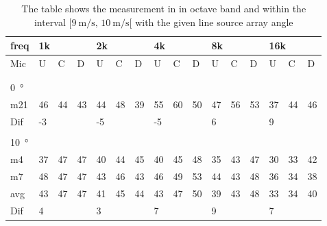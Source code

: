 \begin{table}[H]
\centering
\caption{The table shows the measurement in in octave band and within the interval $[\SI{9}{\meter\per\second},\, \SI{10}{\meter\per\second}[ $ with the given line source array angle}
\begin{tabular}{l|l|l|l|l|l|l|l|l|l|l|l|l|lll}
freq & \multicolumn{3}{l|}{1k} & \multicolumn{3}{l|}{2k} & \multicolumn{3}{l|}{4k} & \multicolumn{3}{l|}{8k} & \multicolumn{3}{l}{16k}                                \\ \hline
Mic  & U      & C      & D     & U      & C      & D     & U      & C      & D     & U      & C      & D     & \multicolumn{1}{l|}{U}  & \multicolumn{1}{l|}{C}  & D  \\ \hline
 & \multicolumn{3}{l|}{} & \multicolumn{3}{l|}{} & \multicolumn{3}{l|}{} & \multicolumn{3}{l|}{} & \multicolumn{3}{l}{}                                \\ 
 \multicolumn{16}{l}{ } \\   
\SI{0}{\degree}   & \multicolumn{3}{l|}{} & \multicolumn{3}{l|}{} & \multicolumn{3}{l|}{} & \multicolumn{3}{l|}{} & \multicolumn{3}{l}{}   \\  \hline
m21  & 46     & 44     & 43    & 44     & 48     & 39    & 55     & 60     & 50    & 47     & 56     & 53    & \multicolumn{1}{l|}{37} & \multicolumn{1}{l|}{44} & 46 \\ \hline 
Dif & \multicolumn{3}{l|}{-3} & \multicolumn{3}{l|}{-5} & \multicolumn{3}{l|}{-5} & \multicolumn{3}{l|}{6} & \multicolumn{3}{l}{9}  \\ 
 \multicolumn{16}{l}{ } \\                             
\SI{10}{\degree}   & \multicolumn{3}{l|}{} & \multicolumn{3}{l|}{} & \multicolumn{3}{l|}{} & \multicolumn{3}{l|}{} & \multicolumn{3}{l}{}   \\  \hline
m4    & 37     & 47     &  47    &  40    &  44    &   45   &  40    &  45     &  48    &  35     & 43     &  47    & \multicolumn{1}{l|}{30} & \multicolumn{1}{l|}{33} & 42 \\
m7    & 48     & 47     &  47    &   43   &   46   &  43    &  46    &  49     &  53    &  44     & 43     & 48     & \multicolumn{1}{l|}{36} & \multicolumn{1}{l|}{34} & 38 \\ \hline
avg &  43    &  47    & 47     &  41    &  45    & 44     & 43     &   47    &   50   &  39     & 43     &  48    & \multicolumn{1}{l|}{33} & \multicolumn{1}{l|}{34}  & 40  \\ \hline  
Dif & \multicolumn{3}{l|}{4} & \multicolumn{3}{l|}{3} & \multicolumn{3}{l|}{7} & \multicolumn{3}{l|}{9} & \multicolumn{3}{l}{7} \\ 

\end{tabular}
\end{table}
